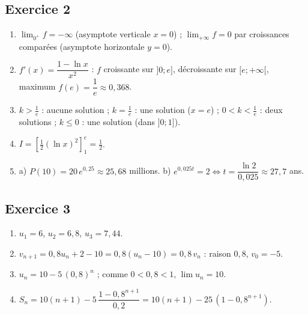 \documentclass[11pt,a4paper]{article}
\begin{document}
\subsection*{Exercice 2}
\begin{enumerate}
  \item $\lim_{0^+} f = -\infty$ (asymptote verticale $x=0$) ; $\lim_{+\infty} f = 0$ par croissances comparées (asymptote horizontale $y=0$).
  \item $f'(x) = \dfrac{1 - \ln x}{x^2}$ : $f$ croissante sur $]0;e]$, décroissante sur $[e;+\infty[$, maximum $f(e) = \dfrac1e \approx 0{,}368$.
  \item $k > \frac1e$ : aucune solution ; $k = \frac1e$ : une solution ($x=e$) ;
  $0 < k < \frac1e$ : deux solutions ; $k \leqslant 0$ : une solution (dans $]0;1]$).
  \item $I = \left[\tfrac12(\ln x)^2\right]_1^e = \tfrac12$.
  \item a) $P(10) = 20\,e^{0{,}25} \approx 25{,}68$ millions.\quad
  b) $e^{0{,}025t} = 2 \iff t = \dfrac{\ln 2}{0{,}025} \approx 27{,}7$ ans.
\end{enumerate}

\subsection*{Exercice 3}
\begin{enumerate}
  \item $u_1 = 6$, $u_2 = 6{,}8$, $u_3 = 7{,}44$.
  \item $v_{n+1} = 0{,}8u_n + 2 - 10 = 0{,}8(u_n - 10) = 0{,}8\,v_n$ : raison $0{,}8$, $v_0 = -5$.
  \item $u_n = 10 - 5\,(0{,}8)^n$ ; comme $0 < 0{,}8 < 1$, $\lim u_n = 10$.
  \item $S_n = 10(n+1) - 5\,\dfrac{1 - 0{,}8^{n+1}}{0{,}2} = 10(n+1) - 25\,(1 - 0{,}8^{n+1})$.
\end{enumerate}
\end{document}
